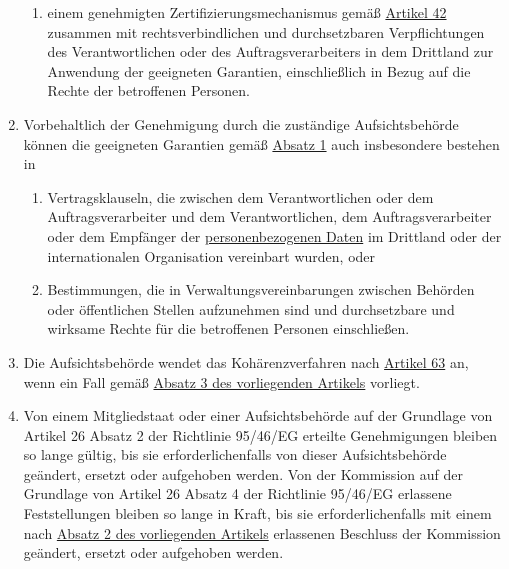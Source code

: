 \begin{enumerate}
\begin{enumerate}
    \item einem genehmigten Zertifizierungsmechanismus gemäß \hyperref[ch:42]{Artikel 42} zusammen mit
     rechtsverbindlichen und durchsetzbaren Verpflichtungen des Verantwortlichen oder des Auftragsverarbeiters in dem
     Drittland zur Anwendung der geeigneten Garantien, einschließlich in Bezug auf die Rechte der betroffenen
     Personen.
    \label{itm:46-2f}

  \end{enumerate}

  \item Vorbehaltlich der Genehmigung durch die zuständige Aufsichtsbehörde können die geeigneten Garantien gemäß
   \hyperref[itm:46-1]{Absatz 1} auch insbesondere bestehen in
  \label{itm:46-3}

  \begin{enumerate}
  
    \item Vertragsklauseln, die zwischen dem Verantwortlichen oder dem Auftragsverarbeiter und dem Verantwortlichen, dem
     Auftragsverarbeiter oder dem Empfänger der \hyperref[itm:04-1]{personenbezogenen Daten} im Drittland oder der internationalen
     Organisation vereinbart wurden, oder
    \label{itm:46-3a}

    \item Bestimmungen, die in Verwaltungsvereinbarungen zwischen Behörden oder öffentlichen Stellen aufzunehmen sind
     und durchsetzbare und wirksame Rechte für die betroffenen Personen einschließen.
    \label{itm:46-3b}

  \end{enumerate}

  \item Die Aufsichtsbehörde wendet das Kohärenzverfahren nach \hyperref[ch:63]{Artikel 63} an, wenn ein Fall gemäß
   \hyperref[itm:46-3]{Absatz 3 des vorliegenden Artikels} vorliegt.
  \label{itm:46-4}

  \item Von einem Mitgliedstaat oder einer Aufsichtsbehörde auf der Grundlage von Artikel 26 Absatz 2 der Richtlinie
   95/46/EG erteilte Genehmigungen bleiben so lange gültig, bis sie erforderlichenfalls von dieser
   Aufsichtsbehörde geändert, ersetzt oder aufgehoben werden. Von der Kommission auf der Grundlage von Artikel 26
   Absatz 4 der Richtlinie 95/46/EG erlassene Feststellungen bleiben so lange in Kraft, bis sie erforderlichenfalls mit
   einem nach \hyperref[itm:46-2]{Absatz 2 des vorliegenden Artikels} erlassenen Beschluss der Kommission geändert,
   ersetzt oder aufgehoben werden.
  \label{itm:46-5}

\end{enumerate}


